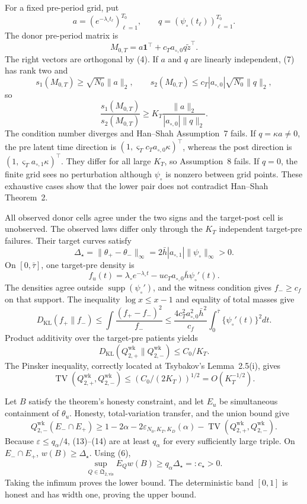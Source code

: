 For a fixed pre-period grid, put
\[
 a=(e^{-\lambda_\circ t_\ell})_{\ell=1}^{T_0},
 \qquad q=(\psi_\circ(t_\ell))_{\ell=1}^{T_0}.
\]
The donor pre-period matrix is
\[
 M_{0,T}=a\mathbf1^\top+c_Ta_{\circ,0}q\widetilde z^\top. \tag{7}
\]
The right vectors are orthogonal by (4).  If \(a\) and \(q\) are linearly independent, (7) has rank two and
\[
 s_1(M_{0,T})\ge\sqrt{N_0}\|a\|_2,
 \qquad
 s_2(M_{0,T})\le c_T|a_{\circ,0}|\sqrt{N_0}\|q\|_2,
\]
so
\[
 \frac{s_1(M_{0,T})}{s_2(M_{0,T})}
 \ge K_T\frac{\|a\|_2}{|a_{\circ,0}|\|q\|_2}.          \tag{8}
\]
The condition number diverges and Han--Shah Assumption~7 fails.  If \(q=\kappa a\ne0\), the pre latent time direction is \((1,\varsigma_Tc_Ta_{\circ,0}\kappa)^\top\), whereas the post direction is \((1,\varsigma_Ta_{\circ,1}\kappa)^\top\).  They differ for all large \(K_T\), so Assumption~8 fails.  If \(q=0\), the finite grid sees no perturbation although \(\psi_\circ\) is nonzero between grid points.  These exhaustive cases show that the lower pair does not contradict Han--Shah Theorem~2.

All observed donor cells agree under the two signs and the target-post cell is unobserved.  The observed laws differ only through the \(K_T\) independent target-pre failures.  Their target curves satisfy
\[
 \Delta_\star=\|\theta_+-\theta_-\|_\infty
 =2\bar h|a_{\circ,1}|\|\psi_\circ\|_\infty>0.        \tag{9}
\]
On \([0,\bar\tau]\), one target-pre density is
\[
 f_u(t)=\lambda_\circ e^{-\lambda_\circ t}
 -u c_Ta_{\circ,0}\bar h\psi_\circ'(t).                \tag{10}
\]
The densities agree outside \(\operatorname{supp}(\psi_\circ')\), and the witness condition gives \(f_-\ge c_f\) on that support.  The inequality \(\log x\le x-1\) and equality of total masses give
\[
 D_{\mathrm{KL}}(f_+\|f_-)
 \le\int\frac{(f_+-f_-)^2}{f_-}
 \le\frac{4c_T^2a_{\circ,0}^2\bar h^2}{c_f}
 \int_0^{\bar\tau}\{\psi_\circ'(t)\}^2dt.             \tag{11}
\]
Product additivity over the target-pre patients yields
\[
 D_{\mathrm{KL}}(Q_{2,+}^{\mathrm{wk}}\|Q_{2,-}^{\mathrm{wk}})
 \le C_0/K_T.                                           \tag{12}
\]
The Pinsker inequality, correctly located at Tsybakov's Lemma~2.5(i), gives
\[
 \operatorname{TV}(Q_{2,+}^{\mathrm{wk}},Q_{2,-}^{\mathrm{wk}})
 \le(C_0/(2K_T))^{1/2}=O(K_T^{-1/2}).                   \tag{13}
\]

Let \(B\) satisfy the theorem's honesty constraint, and let \(E_u\) be simultaneous containment of \(\theta_u\).  Honesty, total-variation transfer, and the union bound give
\[
 Q_{2,-}^{\mathrm{wk}}(E_-\cap E_+)
 \ge1-2\alpha-2\varepsilon_{N_0,K_T,K_D}(\alpha)
 -\operatorname{TV}(Q_{2,+}^{\mathrm{wk}},Q_{2,-}^{\mathrm{wk}}). \tag{14}
\]
Because \(\varepsilon\le q_\alpha/4\), (13)--(14) are at least \(q_\alpha\) for every sufficiently large triple.  On \(E_-\cap E_+\), \(w(B)\ge\Delta_\star\).  Using (6),
\[
 \sup_{Q\in\mathfrak Q_{2,\mathrm{vis}}}E_Qw(B)
 \ge q_\alpha\Delta_\star=:c_\star>0.                 \tag{15}
\]
Taking the infimum proves the lower bound.  The deterministic band \([0,1]\) is honest and has width one, proving the upper bound.

